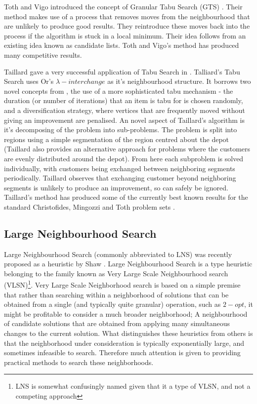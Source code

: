 Toth and Vigo introduced the concept of Granular Tabu Search (GTS) \cite{GHL:1998}. Their method makes use of a process that removes moves from the neighbourhood that are unlikely to produce good results. They reintroduce these moves back into the process if the algorithm is stuck in a local minimum. Their idea follows from an existing idea known as candidate lists. Toth and Vigo's method has produced many competitive results.

Taillard gave a very successful application of Tabu Search in \cite{Taillard:1993}. Talliard's Tabu Search uses Or's $\lambda-interchange$ as it's neighbourhood structure. It borrows two novel concepts from \cite{GHL:1994}, the use of a more sophisticated tabu mechanism - the duration (or number of iterations) that an item is tabu for is chosen randomly, and a diversification strategy, where vertices that are frequently moved without giving an improvement are penalised. An novel aspect of Taillard's algorithm is it's decomposing of the problem into sub-problems. The problem is split into regions using a simple segmentation of the region centred about the depot (Taillard also provides an alternative approach for problems where the customers are evenly distributed around the depot). From here each subproblem is solved individually, with customers being exchanged between neighboring segments periodically. Taillard observes that exchanging customer beyond neighboring segments is unlikely to produce an improvement, so can safely be ignored. Taillard's method has produced some of the currently best known results for the standard Christofides, Mingozzi and Toth problem sets \cite{CMT:1981}. 

\subsection{Large Neighbourhood Search}

Large Neighbourhood Search (commonly abbreviated to LNS) was recently proposed as a heuristic by Shaw \cite{Shaw:1998}. Large Neighbourhood Search is a type heuristic belonging to the family known as Very Large Scale Neighbourhood search (VLSN)\footnote{LNS is somewhat confusingly named given that it a type of VLSN, and not a competing approach}. Very Large Scale Neighborhood search is based on a simple premise that rather than searching within a neighborhood of solutions that can be obtained from a single (and typically quite granular) operation, such as $2-opt$, it might be profitable to consider a much broader neighborhood; A neighbourhood of candidate solutions that are obtained from applying many simultaneous changes to the current solution. What distinguishes these heuristics from others is that the neighborhood under consideration is typically exponentially large, and sometimes infeasible to search. Therefore much attention is given to providing practical methods to search these neighborhoods. 

